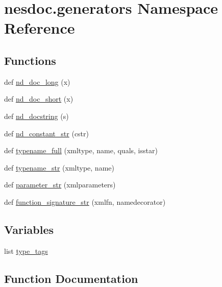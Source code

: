\hypertarget{namespacenesdoc_1_1generators}{}\section{nesdoc.\+generators Namespace Reference}
\label{namespacenesdoc_1_1generators}
\subsection*{Functions}
\begin{DoxyCompactItemize}
\item 
def \hyperlink{namespacenesdoc_1_1generators_a5b7712b687fb010ae18aa81529a530bf}{nd\+\_\+doc\+\_\+long} (x)
\item 
def \hyperlink{namespacenesdoc_1_1generators_aeb765c98754812ffa5770e813c5b4285}{nd\+\_\+doc\+\_\+short} (x)
\item 
def \hyperlink{namespacenesdoc_1_1generators_ae73a645fd0eff8c6a9474e1b0aafc12d}{nd\+\_\+docstring} (s)
\item 
def \hyperlink{namespacenesdoc_1_1generators_a2130d4515c67f1b03227b26763d3122a}{nd\+\_\+constant\+\_\+str} (cstr)
\item 
def \hyperlink{namespacenesdoc_1_1generators_a49c9c7092d18edde0aea17a9827250f2}{typename\+\_\+full} (xmltype, name, quals, isstar)
\item 
def \hyperlink{namespacenesdoc_1_1generators_ac0748263109391371892f02f5302052a}{typename\+\_\+str} (xmltype, name)
\item 
def \hyperlink{namespacenesdoc_1_1generators_ae360d7aec11e5cad8709b7c2eb54480b}{parameter\+\_\+str} (xmlparameters)
\item 
def \hyperlink{namespacenesdoc_1_1generators_acaf8cbf8aa428dfbc7a3f7decc522b9c}{function\+\_\+signature\+\_\+str} (xmlfn, namedecorator)
\end{DoxyCompactItemize}
\subsection*{Variables}
\begin{DoxyCompactItemize}
\item 
list \hyperlink{namespacenesdoc_1_1generators_a75a5cc95a5f7f528400a04896f23dded}{type\+\_\+tags}
\end{DoxyCompactItemize}


\subsection{Function Documentation}
